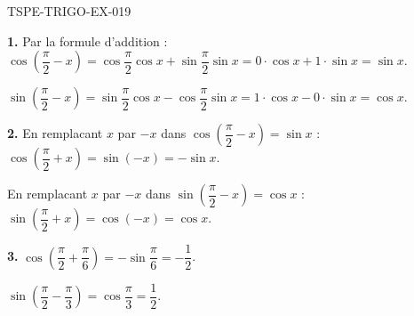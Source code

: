 \begin{corrige}{TSPE-TRIGO-EX-019}

\textbf{1.} Par la formule d'addition :
$\cos\!\left(\dfrac{\pi}{2} - x\right) = \cos\dfrac{\pi}{2}\cos x + \sin\dfrac{\pi}{2}\sin x = 0 \cdot \cos x + 1 \cdot \sin x = \sin x$.

$\sin\!\left(\dfrac{\pi}{2} - x\right) = \sin\dfrac{\pi}{2}\cos x - \cos\dfrac{\pi}{2}\sin x = 1 \cdot \cos x - 0 \cdot \sin x = \cos x$.

\textbf{2.} En remplacant $x$ par $-x$ dans $\cos\!\left(\dfrac{\pi}{2} - x\right) = \sin x$ :
$\cos\!\left(\dfrac{\pi}{2} + x\right) = \sin(-x) = -\sin x$.

En remplacant $x$ par $-x$ dans $\sin\!\left(\dfrac{\pi}{2} - x\right) = \cos x$ :
$\sin\!\left(\dfrac{\pi}{2} + x\right) = \cos(-x) = \cos x$.

\textbf{3.} $\cos\!\left(\dfrac{\pi}{2} + \dfrac{\pi}{6}\right) = -\sin\dfrac{\pi}{6} = -\dfrac{1}{2}$.

$\sin\!\left(\dfrac{\pi}{2} - \dfrac{\pi}{3}\right) = \cos\dfrac{\pi}{3} = \dfrac{1}{2}$.

\end{corrige}

